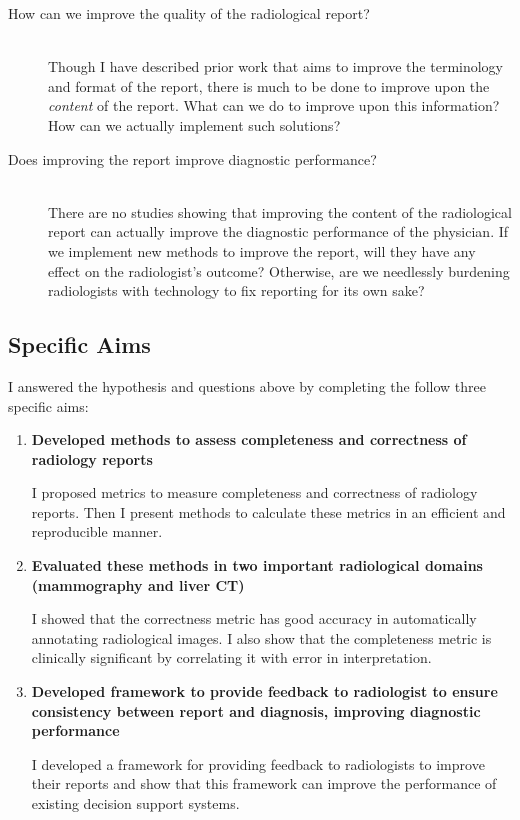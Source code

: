 \begin{description}
	\item[How can we improve the quality of the radiological report?] \hfill \\
	Though I have described prior work that aims to improve the terminology and format of the report, there is much to be done to improve upon the \emph{content} of the report. What can we do to improve upon this information? How can we actually implement such solutions?
	
	\item[Does improving the report improve diagnostic performance?] \hfill \\
	There are no studies showing that improving the content of the radiological report can actually improve the diagnostic performance of the physician. If we implement new methods to improve the report, will they have any effect on the radiologist's outcome? Otherwise, are we needlessly burdening radiologists with technology to fix reporting for its own sake?
		
\end{description}


\subsection{Specific Aims}

I answered the hypothesis and questions above by completing the follow three specific aims:

\begin{enumerate}
	\item \textbf{Developed methods to assess completeness and correctness of radiology reports}
	
	I proposed metrics to measure completeness and correctness of radiology reports. Then I present methods to calculate these metrics in an efficient and reproducible manner.
	
	\item \textbf{Evaluated these methods in two important radiological domains (mammography and liver CT)}
	
	I showed that the correctness metric has good accuracy in automatically annotating radiological images. I also show that the completeness metric is clinically significant by correlating it with error in interpretation.
	
	\item \textbf{Developed framework to provide feedback to radiologist to ensure consistency between report and diagnosis, improving diagnostic performance}
	
	I developed a framework for providing feedback to radiologists to improve their reports and show that this framework can improve the performance of existing decision support systems.
\end{enumerate}

